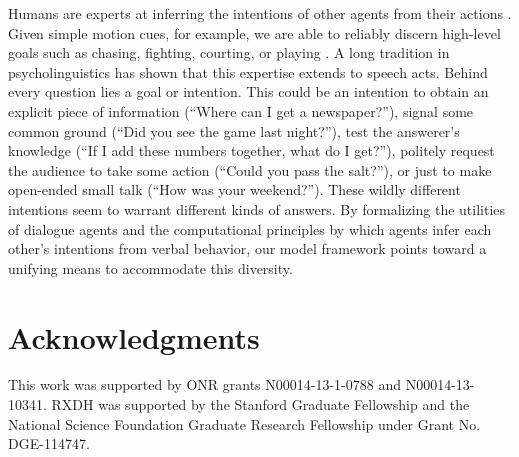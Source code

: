 \documentclass[12pt, floatsintext, jou]{apa6}
\begin{document}
Humans are experts at inferring the intentions of other agents from their actions \cite{TomaselloCarpenter___Moll05_IntentionsCulturalCognition, BakerSaxeTenenbaum09_ActionUnderstandingInversePlanning}. Given simple motion cues, for example, we are able to reliably discern high-level goals such as chasing, fighting, courting, or playing \cite{BarrettToddMillerBlythe05_IntentionFromMotionCues, HeiderSimmel44_Animacy}. A long tradition in psycholinguistics has shown that this expertise extends to speech acts.  Behind every question lies a goal or intention. This could be an intention to obtain an explicit piece of information (``Where can I get a newspaper?''), signal some common ground (``Did you see the game last night?''), test the answerer's knowledge (``If I add these numbers together, what do I get?''), politely request the audience to take some action (``Could you pass the salt?''), or just to make open-ended small talk (``How was your weekend?''). These wildly different intentions seem to warrant different kinds of answers. %
By formalizing the utilities of dialogue agents and the computational principles by which agents infer each other's intentions from verbal behavior, our model framework points toward a unifying means to accommodate this diversity. 

\section{\bf Acknowledgments}
\small
\noindent This work was supported by ONR grants N00014-13-1-0788 and N00014-13-10341. RXDH was supported by the Stanford Graduate Fellowship and the National Science Foundation Graduate Research Fellowship under Grant No. DGE-114747.



\end{document}
